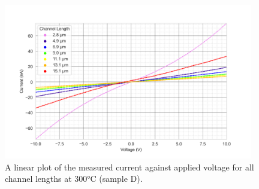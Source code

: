 \begin{figure}[h]
    \centering
    \includegraphics[width=0.97\textwidth]{Chapter3/Figs/Raster/Sample D 2019/IV/10V IV characteristics at 300 C.png}
    \caption{A linear plot of the measured current against applied voltage for all channel lengths at 300\si{\degreeCelsius} (sample D).}
    \label{appfig:D_current_voltage_300_10V}
\end{figure}


